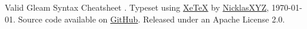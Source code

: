 \medskip
\vfill
{\scriptsize
  \sloppy Valid Gleam {\gleamv} Syntax Cheatsheet {\posterv}.
  Typeset using \href{https://tug.org/xetex/}{XeTeX} by 
  \href{https://github.com/NicklasXYZ/}{NicklasXYZ}, \today.
  Source code available on \href{https://github.com/NicklasXYZ/gleam\_cheatsheets/}{GitHub}.
  Released under an Apache License 2.0.
\par}



